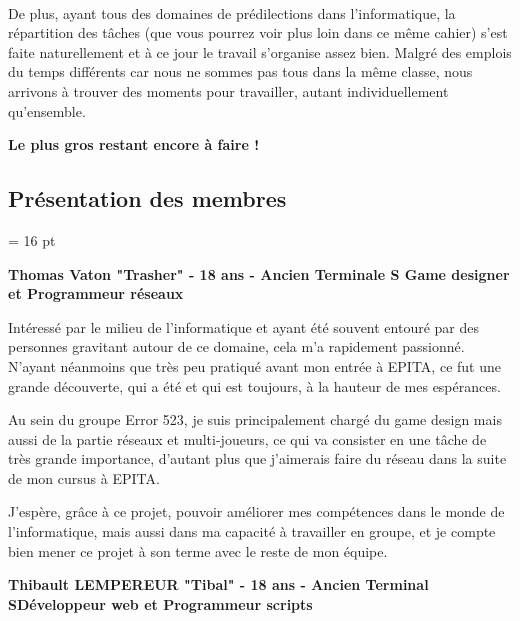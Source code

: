 \documentclass[12pt,a4paper]{article}
\begin{document}
\paragraph{}
De plus, ayant tous des domaines de prédilections dans l'informatique, la répartition des tâches (que vous pourrez voir plus loin dans ce même cahier) s'est faite naturellement et à ce jour le travail s'organise assez bien. Malgré des emplois du temps différents car nous ne sommes pas tous dans la même classe, nous arrivons à trouver des moments pour travailler, autant individuellement qu'ensemble.
\begin{center}
\textbf{Le plus gros restant encore à faire !}
\end{center}
\newpage
\subsection{Présentation des membres}
\baselineskip = 16 pt
\begin{center}
\textbf{Thomas Vaton "Trasher" - 18 ans - Ancien Terminale S\newline
Game designer et Programmeur réseaux}
\end{center}

Intéressé par le milieu de l'informatique et ayant été souvent entouré par des personnes gravitant autour de ce domaine, cela m'a rapidement passionné. N'ayant néanmoins que très peu pratiqué avant mon entrée à EPITA, ce fut une grande découverte, qui a été et qui est toujours, à la hauteur de mes espérances.

Au sein du groupe Error 523, je suis principalement chargé du game design mais aussi de la partie réseaux et multi-joueurs, ce qui va consister en une tâche de très grande importance, d'autant plus que j'aimerais faire du réseau dans la suite de mon cursus à EPITA.
   
J'espère, grâce à ce projet, pouvoir améliorer mes compétences dans le monde de l'informatique, mais aussi dans ma capacité à travailler en groupe, et je compte bien mener ce projet à son terme avec le reste de mon équipe.

\begin{center}
\textbf{Thibault LEMPEREUR "Tibal" - 18 ans - Ancien Terminal S\newline Développeur web et Programmeur scripts}

\end{center}
\end{document}
